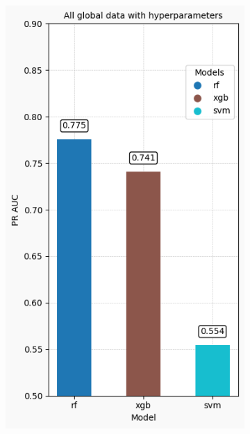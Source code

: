 \documentclass{article}
\begin{document}
\begin{figure}[H]
\begin{subfigure}[b]{0.15\linewidth}
        \label{fig:global_data}
    \end{subfigure}
    \hspace{0.1cm}  %
    \begin{subfigure}[b]{0.15\linewidth}
        \centering
        \includegraphics[width=\linewidth]{All global data with hyperparameters.png}
        \caption{}
        \label{fig:global_data_hyperparams}
    \end{subfigure}
    \hspace{0.1cm}

\end{figure}
\end{document}
